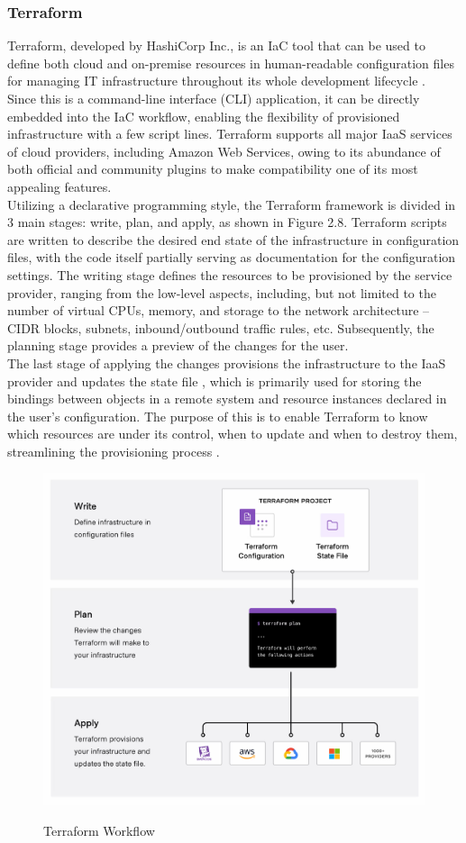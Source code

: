 \subsubsection{Terraform}
Terraform, developed by HashiCorp Inc., is an IaC tool that can be used to define both cloud and on-premise resources in human-readable configuration files for managing IT infrastructure throughout its whole development lifecycle \cite{tf_intro}.\\
Since this is a command-line interface (CLI) application, it can be directly embedded into the IaC workflow, enabling the flexibility of provisioned infrastructure with a few script lines. Terraform supports all major IaaS services of cloud providers, including Amazon Web Services, owing to its abundance of both official and community plugins to make compatibility one of its most appealing features. \cite{stender2020cloud}\\
Utilizing a declarative programming style, the Terraform framework is divided in 3 main stages: write, plan, and apply, as shown in Figure 2.8. Terraform scripts are written to describe the desired end state of the infrastructure in configuration files, with the code itself partially serving as documentation for the configuration settings. The writing stage defines the resources to be provisioned by the service provider, ranging from the low-level aspects, including, but not limited to the number of virtual CPUs, memory, and storage to the network architecture -- CIDR blocks, subnets, inbound/outbound traffic rules, etc. Subsequently, the planning stage provides a preview of the changes for the user.\\
The last stage of applying the changes provisions the infrastructure to the IaaS provider and updates the state file \cite{tf_state}, which is primarily used for storing the bindings between objects in a remote system and resource instances declared in the user's configuration. The purpose of this is to enable Terraform to know which resources are under its control, when to update and when to destroy them, streamlining the provisioning process \cite{tf_state_2}.

\begin{figure}[H]
	\centering
	\includegraphics[width=0.8 \linewidth]{Images/tf_workflow.png}
	\caption{Terraform Workflow}
	\label{fig:Tf_workflow}
    \cite{tf_intro}
\end{figure}


